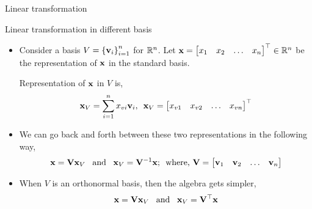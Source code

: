 \documentclass[aspectratio=169]{beamer}
\let\olditem\item
\renewcommand{\item}{\setlength{\itemsep}{\fill}\olditem}
\def\mf{\ensuremath\mathbf}
\def\mb{\ensuremath\mathbb}
\begin{document}
\begin{frame}[t]{Linear transformation}
\begin{center}
\end{center}

\end{frame}


\begin{frame}[t]{Linear transformation in different basis}
\begin{itemize}
    \item Consider a basis $V=\left\{\mf{v}_i\right\}_{i=1}^{n}$ for $\mb{R}^n$. Let $\mf{x} = \begin{bmatrix*}x_1 & x_2 & \ldots & x_n\end{bmatrix*}^\top \in \mb{R}^n$ be the representation of $\mf{x}$ in 
    the standard basis.
    
    Representation of $\mf{x}$ in $V$ is,
    \[ \mf{x}_{V} = \sum_{i=1}^n x_{vi}\mf{v}_i, \,\,\, \mf{x}_V = \begin{bmatrix*}x_{v1} & x_{v2} & \ldots & x_{vn}\end{bmatrix*}^\top \]

    \item We can go back and forth between these two representations in the following way,
    \[ \mf{x} = \mf{V}\mf{x}_V \,\,\, \text{ and } \,\,\, \mf{x}_V = \mf{V}^{-1}\mf{x}; \,\,\, \text{where, } \mf{V} = \begin{bmatrix*}\mf{v}_1 & \mf{v}_2 & \ldots & \mf{v}_n\end{bmatrix*} \]

    \item When $V$ is an orthonormal basis, then the algebra gets simpler,
    \[ \mf{x} = \mf{V}\mf{x}_V \,\,\, \text{ and } \,\,\, \mf{x}_V = \mf{V}^\top\mf{x} \]

\end{itemize}
\end{frame}
\end{document}
